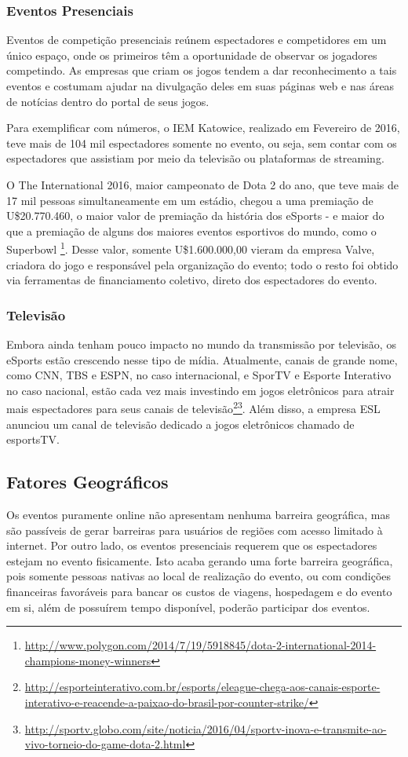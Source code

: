 \documentclass[a4paper, 12pt]{paper}
\begin{document}
\subsubsection{Eventos Presenciais}
Eventos de competição presenciais reúnem espectadores e competidores em um único espaço, onde os primeiros têm a oportunidade de observar os jogadores competindo. As empresas que criam os jogos tendem a dar reconhecimento a tais eventos e costumam ajudar na divulgação deles em suas páginas web e nas áreas de notícias dentro do portal de seus jogos.

Para exemplificar com números, o IEM Katowice, realizado em Fevereiro de 2016, teve mais de 104 mil espectadores somente no evento, ou seja, sem contar com os espectadores que assistiam por meio da televisão ou plataformas de streaming.

O The International 2016, maior campeonato de Dota 2 do ano, que teve mais de 17 mil pessoas simultaneamente em um estádio, chegou a uma premiação de U\$20.770.460, o maior valor de premiação da história dos eSports - e maior do que a premiação de alguns dos maiores eventos esportivos do mundo, como o Superbowl \footnote{\url{http://www.polygon.com/2014/7/19/5918845/dota-2-international-2014-champions-money-winners}}. Desse valor, somente U\$1.600.000,00 vieram da empresa Valve, criadora do jogo e responsável pela organização do evento; todo o resto foi obtido via ferramentas de financiamento coletivo, direto dos espectadores do evento.
\subsubsection{Televisão}
Embora ainda tenham pouco impacto no mundo da transmissão por televisão, os eSports estão crescendo nesse tipo de mídia. Atualmente, canais de grande nome, como CNN, TBS e ESPN, no caso internacional, e SporTV e Esporte Interativo no caso nacional, estão cada vez mais investindo em jogos eletrônicos para atrair mais espectadores para seus canais de televisão\footnote{\url{http://esporteinterativo.com.br/esports/eleague-chega-aos-canais-esporte-interativo-e-reacende-a-paixao-do-brasil-por-counter-strike/}}\footnote{\url{http://sportv.globo.com/site/noticia/2016/04/sportv-inova-e-transmite-ao-vivo-torneio-do-game-dota-2.html}}. Além disso, a empresa ESL anunciou um canal de televisão dedicado a jogos eletrônicos chamado de esportsTV.
\subsection{Fatores Geográficos}
Os eventos puramente online não apresentam nenhuma barreira geográfica, mas são passíveis de gerar barreiras para usuários de regiões com acesso limitado à internet. Por outro lado, os eventos presenciais requerem que os espectadores estejam no evento fisicamente. Isto acaba gerando uma forte barreira geográfica, pois somente pessoas nativas ao local de realização do evento, ou com condições financeiras favoráveis para bancar os custos de viagens, hospedagem e do evento em si, além de possuírem tempo disponível, poderão participar dos eventos.
\end{document}
